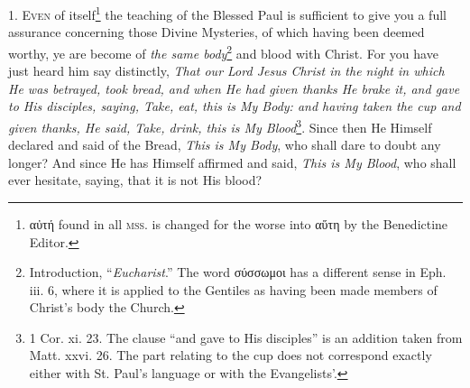 1. \textsc{Even} of itself\footnote{\textgreek{αὐτή} found in all \textsc{mss.} is changed for the worse into \textgreek{αὕτη} by the Benedictine Editor.} the teaching of the Blessed Paul is sufficient to give you a full assurance concerning those Divine Mysteries, of which having been deemed worthy, ye are become of \emph{the same body}\footnote{Introduction, “\emph{Eucharist}.” The word \textgreek{σύσσωμοι} has a different sense in Eph. iii. 6, where it is applied to the Gentiles as having been made members of Christ’s body the Church.} and blood with Christ. For you have just heard him say distinctly, \emph{That our Lord Jesus Christ in the night in which He was betrayed, took bread, and when He had given thanks He brake it, and gave to His disciples, saying, Take, eat, this is My Body: and having taken the cup and given thanks, He said, Take, drink, this is My Blood}\footnote{1 Cor. xi. 23. The clause “and gave to His disciples” is an addition taken from Matt. xxvi. 26. The part relating to the cup does not correspond exactly either with St. Paul’s language or with the Evangelists’.}. Since then He Himself declared and said of the Bread, \emph{This is My Body}, who shall dare to doubt any longer? And since He has Himself affirmed and said, \emph{This is My Blood}, who shall ever hesitate, saying, that it is not His blood?

